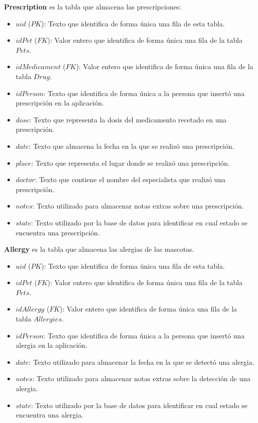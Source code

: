 \textbf{Prescription} es la tabla que almacena las prescripciones:

\begin{itemize}
\item	$uid$ ($PK$): Texto que identifica de forma única una fila de esta tabla.
\item	$idPet$ ($FK$): Valor entero que identifica de forma única una fila de la tabla $Pets$.
\item	$idMedicament$ ($FK$): Valor entero que identifica de forma única una fila de la tabla $Drug$.
\item	$idPerson$: Texto que identifica de forma única a la persona que insertó una prescripción en la aplicación.
\item	$dose$: Texto que representa la dosis del medicamento recetado en una prescripción.
\item	$date$: Texto que almacena la fecha en la que se realizó una prescripción.
\item	$place$: Texto que representa el lugar donde se realizó una prescripción.
\item	$doctor$: Texto que contiene el nombre del especialista que realizó una prescripción.
\item	$notes$: Texto utilizado para almacenar notas extras sobre una prescripción.
\item	$state$: Texto utilizado por la base de datos para identificar en cual estado se encuentra una prescripción.

\end{itemize}

\textbf{Allergy} es la tabla que almacena las alergias de las mascotas.
\begin{itemize}


\item	$uid$ ($PK$): Texto que identifica de forma única una fila de esta tabla.
\item	$idPet$ ($FK$): Valor entero que identifica de forma única una fila de la tabla $Pets$.
\item	$idAllergy$ ($FK$): Valor entero que identifica de forma única una fila de la tabla $Allergies$.
\item	$idPerson$: Texto que identifica de forma única a la persona que insertó una alergia en la aplicación.
\item	$date$: Texto utilizado para almacenar la fecha en la que se detectó una alergia.
\item	$notes$: Texto utilizado para almacenar notas extras sobre la detección de una alergia.
\item	$state$: Texto utilizado por la base de datos para identificar en cual estado se encuentra una alergia.
\end{itemize}


